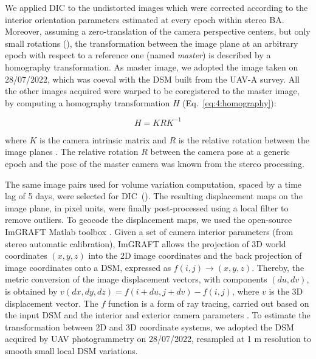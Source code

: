 We applied DIC to the undistorted images which were corrected according to the interior
orientation parameters estimated at every epoch within stereo BA.
Moreover, assuming a zero-translation of the camera perspective centers, but only small
rotations (), the transformation between the image plane at an
arbitrary epoch with respect to a reference one (named \textit{master}) is
described by a homography transformation.
As master image, we adopted the image taken on 28/07/2022, which was
coeval with the DSM built from the UAV-A survey.
All the other images acquired were warped to be coregistered to the master image,
by computing a homography transformation \(H\) (Eq.~\ref{eq:4:homography}):

\begin{equation}
  H = KRK^{-1}
  \label{eq:4:homography}
\end{equation}

where \(K\) is the camera intrinsic matrix and \(R\) is the relative
rotation between the image planes \citep{forstner2016}.
The relative rotation \(R\) between the camera pose at a generic epoch and the pose of
the master camera was known from the stereo processing.

The same image pairs used for volume  variation computation, spaced by a time lag of 5
days, were selected for DIC~().
The resulting displacement maps on the image plane, in pixel units, were finally
post-processed using a local filter to remove outliers.
To geocode the displacement maps, we used the open-source ImGRAFT Matlab toolbox
\citep{Messerli2015}.
Given a set of camera interior parameters (from stereo automatic calibration), ImGRAFT
allows the projection of 3D world coordinates \((x,y,z)\) into the 2D image coordinates
and the back projection of image coordinates onto a DSM, expressed as \(f(i,j) \to
(x,y,z)\). Thereby, the metric conversion of the image displacement vectors, with
components \((du,dv)\), is obtained by \(v(dx,dy,dz) = f(i+du,j+dv)-f(i,j)\), where
\(v\) is the 3D displacement vector. The \(f\) function is a form of ray tracing, carried
out based on the input DSM and the interior and exterior camera parameters
\citep{Messerli2015}.
To estimate the transformation between 2D and 3D coordinate systems,
we adopted the DSM acquired by UAV photogrammetry on 28/07/2022,
resampled at 1 m resolution to smooth small local DSM variations.

